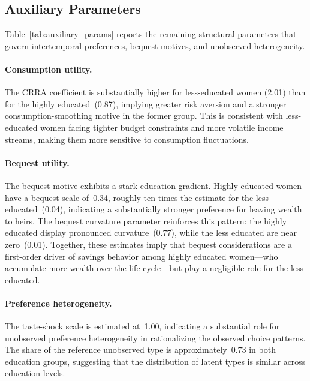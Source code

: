 


\subsection{Auxiliary Parameters}
\label{sec:results_auxiliary}

Table~\ref{tab:auxiliary_params} reports the remaining structural
parameters that govern intertemporal preferences, bequest motives,
and unobserved heterogeneity.

\paragraph{Consumption utility.}
The CRRA coefficient is substantially higher for less-educated women
(2.01) than for the highly educated~(0.87), implying greater risk
aversion and a stronger consumption-smoothing motive in the former
group.  This is consistent with less-educated women facing tighter
budget constraints and more volatile income streams, making them
more sensitive to consumption fluctuations.

\paragraph{Bequest utility.}
The bequest motive exhibits a stark education gradient.  Highly
educated women have a bequest scale of~0.34, roughly ten times the
estimate for the less educated~(0.04), indicating a substantially
stronger preference for leaving wealth to heirs.  The bequest
curvature parameter reinforces this pattern: the highly educated
display pronounced curvature~(0.77), while the less educated are near
zero~(0.01).  Together, these estimates imply that bequest
considerations are a first-order driver of savings behavior among
highly educated women---who accumulate more wealth over the life
cycle---but play a negligible role for the less educated.

\paragraph{Preference heterogeneity.}
The taste-shock scale is estimated at~1.00, indicating a substantial
role for unobserved preference heterogeneity in rationalizing the
observed choice patterns.  The share of the reference unobserved type
is approximately~0.73 in both education groups, suggesting that the
distribution of latent types is similar across education levels.

